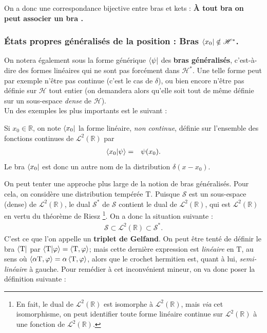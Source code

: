 On a donc une correspondance bijective entre bras et kets : {\bf À tout bra  on peut associer un bra .}

\subsubsection{États propres généralisés de la position : Bras $\bra{x_0} \notin \mathscr H^\ast$.}

On notera également sous la forme générique $\bra{\psi}$ des {\bf bras généralisés}, c'est-à-dire des formes linéaires qui ne sont pas forcément dans $\mathscr H^\ast$. Une telle forme peut par exemple n'être pas continue (c'est le cas de $\delta$), ou bien encore n'être pas définie sur $\mathscr H$ tout entier (on demandera alors qu'elle soit tout de même définie sur un sous-espace {\em dense} de $\mathscr H$).\\

Un des exemples les plus importants est le suivant :\\

\begin{Defi}
    Si $x_0 \in \mathbb R$, on note $\bra{x_0}$ la forme linéaire, {\em non continue}, définie sur l'ensemble des fonctions continues de $\mathcal L^2(\mathbb R)$ par 
    \begin{eqnarray}
        \braket{x_0 \vert \psi } & = & \psi(x_0).
    \end{eqnarray}
    Le bra $\bra{x_0}$ est donc un autre nom de la distribution $\delta(x-x_0)$.
\end{Defi}

On peut tenter une approche plus large de la notion de bras généralisés. Pour cela, on considère une distribution tempérée $\mathrm T$. Puisque $\mathscr S$ est un sous-espace (dense) de $\mathcal L^2(\mathbb R)$, le dual $\mathscr S^\ast$ de $\mathscr S$ contient le dual de $\mathcal L^2 (\mathbb R)$, qui est $\mathcal L^2(\mathbb R)$ en vertu du théorème de Riesz \footnote{En fait, le dual de $\mathcal L^2(\mathbb R)$ est isomorphe à $\mathcal L^2(\mathbb R)$, mais {\em via} cet isomorphisme, on peut identifier toute forme linéaire continue sur $\mathcal L^2(\mathbb R)$ à une fonction de $\mathcal L^2(\mathbb R)$.}. On  a donc la situation suivante :
\begin{eqnarray}
    \mathscr S \subset \mathcal L^2 (\mathbb R) \subset \mathscr S^\ast .
\end{eqnarray}
C'est ce que l'on appelle un {\bf triplet de Gelfand}. On peut être tenté de définir le bra $\bra{\mathrm T}$ par $\braket{\mathrm T \vert \varphi } = \braket{\mathrm T , \varphi }$; mais cette dernière expression est {\em linéaire} en $\mathrm T$, au sens où $\braket{\alpha \mathrm T , \varphi } = \alpha \braket{\mathrm T , \varphi }$, alors que le crochet hermitien est, quant à lui, {\em semi-linéaire} à gauche. Pour remédier à cet inconvénient mineur, on va donc poser la définition suivante :

